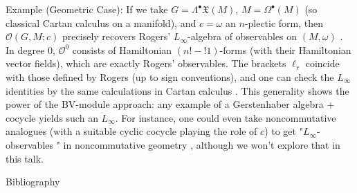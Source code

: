 \documentclass[beamer,10pt,handout]{standalone}  \Handouttrue
\begin{document}
{    Example (Geometric Case): If we take $G = \Lambda^\bullet \mathfrak X(M)$, $M = \Omega^\bullet(M)$ (so classical Cartan calculus on a manifold), and $c = \omega$ an $n$-plectic form, then $\mathcal{O}(G,M;c)$ precisely recovers Rogers’ $L_\infty$-algebra of observables on $(M,\omega)$  . In degree 0, $\mathcal{O}^0$ consists of Hamiltonian $(n!-!1)$-forms (with their Hamiltonian vector fields), which are exactly Rogers’ observables. The brackets $\ell_r$ coincide with those defined by Rogers (up to sign conventions), and one can check the $L_\infty$ identities by the same calculations in Cartan calculus . This generality shows the power of the BV-module approach: any example of a Gerstenhaber algebra + cocycle yields such an $L_\infty$. For instance, one could even take noncommutative analogues (with a suitable cyclic cocycle playing the role of $c$) to get  "$L_\infty$-observables " in noncommutative geometry  , although we won’t explore that in this talk.}


\ifstandalone
\begin{frame}[t,allowframebreaks]{Bibliography}
	\printbibliography
\end{frame}
\fi



\end{document}
